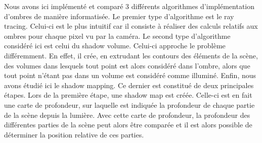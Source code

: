 \documentclass[a4paper,10pt]{report}
\begin{document}
Nous avons ici implémenté et comparé 3 différents algorithmes d'implémentation d'ombres de manière informatisée. Le premier type d'algorithme est le ray tracing. Celui-ci est le plus intuitif car il consiste à réaliser des calculs relatifs aux ombres pour chaque pixel vu par la caméra. Le second type d'algorithme considéré ici est celui du shadow volume. Celui-ci approche le problème différemment. En effet, il crée, en extrudant les contours des éléments de la scène, des volumes dans lesquels tout point est alors considéré dans l'ombre, alors que tout point n'étant pas dans un volume est considéré comme illuminé. Enfin, nous avons étudié ici le shadow mapping. Ce dernier est constitué de deux principales étapes. Lors de la première étape, une shadow map est créée. Celle-ci est en fait une carte de profondeur, sur laquelle est indiquée la profondeur de chaque partie de la scène depuis la lumière. Avec cette carte de profondeur, la profondeur des différentes parties de la scène peut alors être comparée et il est alors possible de déterminer la position relative de ces parties.






\end{document}
